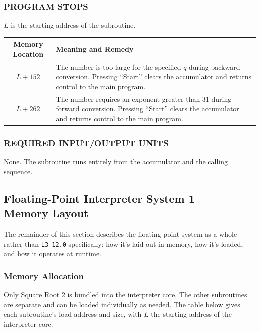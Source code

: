 \subsubsection*{PROGRAM STOPS}
$L$ is the starting address of the subroutine.

\begin{table}[h!]
\centering
\setlength{\extrarowheight}{5pt}
\begin{tabular}{|c|p{8.5cm}|}
\hline
\textbf{Memory Location} & \textbf{Meaning and Remedy} \\ \hline
$L+152$ & The number is too large for the specified $q$ during backward conversion. Pressing ``Start'' clears the accumulator and returns control to the main program. \\ \hline
$L+262$ & The number requires an exponent greater than 31 during forward conversion. Pressing ``Start'' clears the accumulator and returns control to the main program. \\ \hline
\end{tabular}
\end{table}

\subsubsection*{REQUIRED INPUT/OUTPUT UNITS}
None. The subroutine runs entirely from the accumulator and the calling sequence.

\subsection*{Floating-Point Interpreter System 1 --- Memory Layout}
The remainder of this section describes the floating-point system as a whole rather than \texttt{L3-12.0} specifically: how it's laid out in memory, how it's loaded, and how it operates at runtime.

\subsubsection*{Memory Allocation}
Only Square Root 2 is bundled into the interpreter core. The other subroutines are separate and can be loaded individually as needed. The table below gives each subroutine's load address and size, with $L$ the starting address of the interpreter core.

